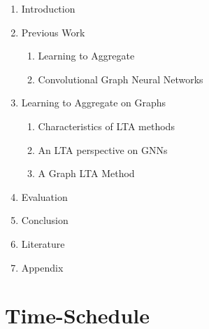 \documentclass[12pt]{scrartcl}
\begin{document}
\begin{enumerate}
	\item Introduction
	\item Previous Work
		\begin{enumerate}[label*=\arabic*.]
			\item Learning to Aggregate
			\item Convolutional Graph Neural Networks
		\end{enumerate}
	\item Learning to Aggregate on Graphs
	\begin{enumerate}[label*=\arabic*.]
		\item Characteristics of LTA methods
		\item An LTA perspective on GNNs
		\item A Graph LTA Method
	\end{enumerate}
	\item Evaluation
	\item Conclusion
	\item Literature
	\item Appendix
\end{enumerate}

\section{Time-Schedule}%
\label{sec:schedule}
\end{document}
